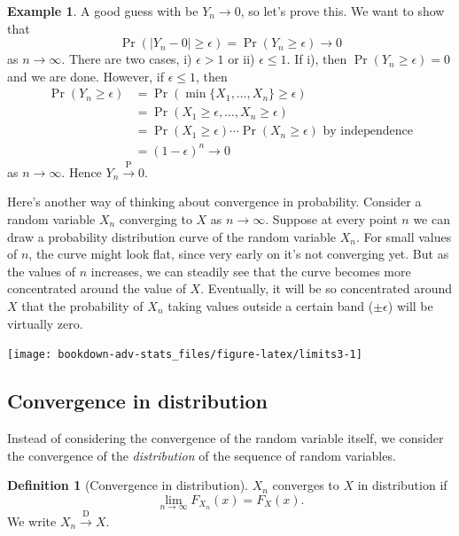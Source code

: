 \documentclass[
]{book}
\theoremstyle{definition}
\newtheorem{definition}{Definition}[chapter]
\theoremstyle{definition}
\newtheorem{example}{Example}[chapter]
\theoremstyle{definition}
\theoremstyle{definition}
\theoremstyle{remark}
\begin{document}
\begin{example}
A good guess with be \(Y_n \to 0\), so let's prove this.
We want to show that
\[\Pr(|Y_n-0| \geq \epsilon)=\Pr(Y_n\geq \epsilon)\to 0\]
as \(n\to \infty\). There are two cases, i) \(\epsilon > 1\) or ii) \(\epsilon \leq 1\). If i), then \(\Pr(Y_n\geq \epsilon)=0\) and we are done. However, if \(\epsilon \leq 1\), then
\[
\begin{aligned}
\Pr(Y_n\geq \epsilon) 
&= \Pr(\min\{X_1,\dots,X_n\} \geq \epsilon) \\
&=\Pr(X_1 \geq \epsilon, \dots, X_n \geq \epsilon) \\
&=\Pr(X_1\geq \epsilon)\cdots \Pr(X_n\geq \epsilon) \text{ by independence}\\
&=(1-\epsilon)^n \to 0
\end{aligned}
\]
as \(n\to \infty\). Hence \(Y_n \xrightarrow{\text{P}} 0\).
\end{example}

Here's another way of thinking about convergence in probability.
Consider a random variable \(X_n\) converging to \(X\) as \(n\to\infty\).
Suppose at every point \(n\) we can draw a probability distribution curve of the random variable \(X_n\).
For small values of \(n\), the curve might look flat, since very early on it's not converging yet.
But as the values of \(n\) increases, we can steadily see that the curve becomes more concentrated around the value of \(X\).
Eventually, it will be so concentrated around \(X\) that the probability of \(X_n\) taking values outside a certain band (\(\pm\epsilon\)) will be virtually zero.

\begin{center}\texttt{[image: bookdown-adv-stats\_files/figure-latex/limits3-1]} \end{center}

\hypertarget{convergence-in-distribution}{%
\subsection{Convergence in distribution}\label{convergence-in-distribution}}

Instead of considering the convergence of the random variable itself, we consider the convergence of the \emph{distribution} of the sequence of random variables.

\begin{definition}[Convergence in distribution]
\(X_n\) converges to \(X\) in distribution if
\[\lim_{n\to\infty}F_{X_n}(x) = F_X(x).\]
We write
\(X_n\xrightarrow{\text{D}}X\).
\end{definition}
\end{document}
